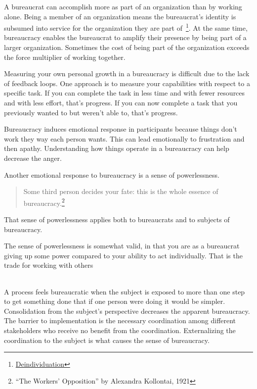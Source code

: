 A bureaucrat can accomplish more as part of an organization than by working alone. Being a member of an organization means the bureaucrat's identity is subsumed into service for the organization they are part of~\footnote{\href{https://en.wikipedia.org/wiki/Deindividuation}{Deindividuation}}. At the same time, bureaucracy enables the bureaucrat to amplify their presence by being part of a larger organization.  Sometimes the cost of being part of the organization exceeds the force multiplier of working together. 




Measuring your own personal growth in a bureaucracy is difficult due to the lack of feedback loops. One approach is to measure your capabilities with respect to a specific task. If you can complete the task in less time and with fewer resources and with less effort, that's progress. If you can now complete a task that you previously wanted to but weren't able to, that's progress.



Bureaucracy induces emotional response in participants because things don't work they way each person wants. This can lead emotionally to frustration and then apathy. Understanding how things operate in a bureaucracy can help decrease the anger.


Another emotional response to bureaucracy is a sense of powerlessness. 
\begin{quote}
Some third person decides your fate: this is the whole essence of bureaucracy.\footnote{``The Workers' Opposition'' by Alexandra Kollontai, 1921}
\end{quote}
That sense of powerlessness applies both to bureaucrats and to subjects of bureaucracy. 

The sense of powerlessness is somewhat valid, in that you are as a bureaucrat giving up some power compared to your ability to act individually. That is the trade for working with others

\ \\

A process feels bureaucratic when the subject is exposed to more than one step to get something done that if one person were doing it would be simpler. Consolidation from the subject's perspective decreases the apparent bureaucracy. The barrier to implementation is the necessary coordination among different stakeholders who receive no benefit from the coordination. Externalizing the coordination to the subject is what causes the sense of bureaucracy. 


